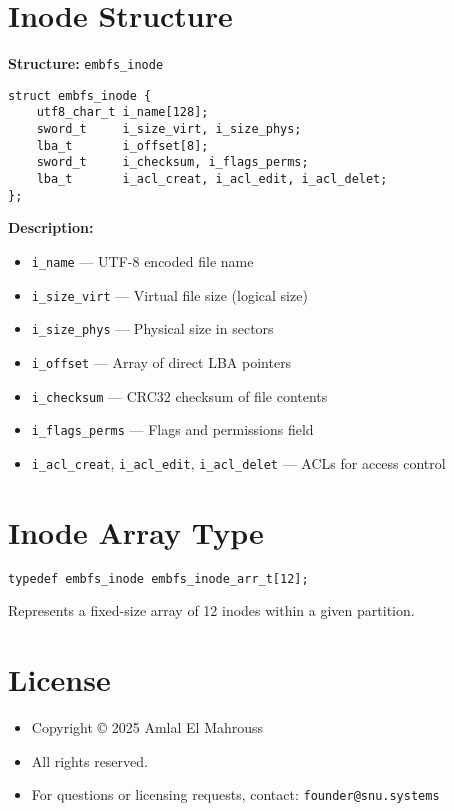 \documentclass{article}
\begin{document}
\section{Inode Structure}
\textbf{Structure:} \texttt{embfs\_inode}
\begin{lstlisting}
struct embfs_inode {
    utf8_char_t i_name[128];
    sword_t     i_size_virt, i_size_phys;
    lba_t       i_offset[8];
    sword_t     i_checksum, i_flags_perms;
    lba_t       i_acl_creat, i_acl_edit, i_acl_delet;
};
\end{lstlisting}

\textbf{Description:}
\begin{itemize}
    \item \texttt{i\_name} — UTF-8 encoded file name
    \item \texttt{i\_size\_virt} — Virtual file size (logical size)
    \item \texttt{i\_size\_phys} — Physical size in sectors
    \item \texttt{i\_offset} — Array of direct LBA pointers
    \item \texttt{i\_checksum} — CRC32 checksum of file contents
    \item \texttt{i\_flags\_perms} — Flags and permissions field
    \item \texttt{i\_acl\_creat}, \texttt{i\_acl\_edit}, \texttt{i\_acl\_delet} — ACLs for access control
\end{itemize}

\section{Inode Array Type}
\begin{lstlisting}
typedef embfs_inode embfs_inode_arr_t[12];
\end{lstlisting}
Represents a fixed-size array of 12 inodes within a given partition.

\section{License}
\begin{itemize}
    \item Copyright © 2025 Amlal El Mahrouss
    \item All rights reserved.
    \item For questions or licensing requests, contact: \texttt{founder@snu.systems}
\end{itemize}
\end{document}
